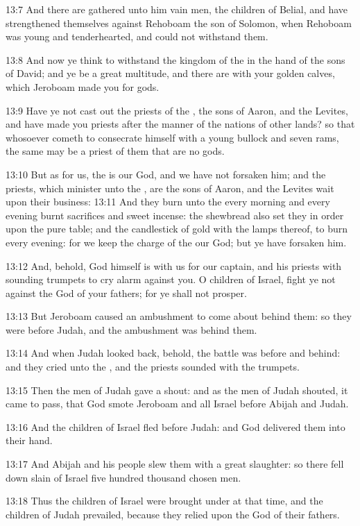 13:7 And there are gathered unto him vain men, the children of Belial,
and have strengthened themselves against Rehoboam the son of Solomon,
when Rehoboam was young and tenderhearted, and could not withstand
them.

13:8 And now ye think to withstand the kingdom of the \LORD in the hand
of the sons of David; and ye be a great multitude, and there are with
your golden calves, which Jeroboam made you for gods.

13:9 Have ye not cast out the priests of the \LORD, the sons of Aaron,
and the Levites, and have made you priests after the manner of the
nations of other lands? so that whosoever cometh to consecrate himself
with a young bullock and seven rams, the same may be a priest of them
that are no gods.

13:10 But as for us, the \LORD is our God, and we have not forsaken
him; and the priests, which minister unto the \LORD, are the sons of
Aaron, and the Levites wait upon their business: 13:11 And they burn
unto the \LORD every morning and every evening burnt sacrifices and
sweet incense: the shewbread also set they in order upon the pure
table; and the candlestick of gold with the lamps thereof, to burn
every evening: for we keep the charge of the \LORD our God; but ye have
forsaken him.

13:12 And, behold, God himself is with us for our captain, and his
priests with sounding trumpets to cry alarm against you. O children of
Israel, fight ye not against the \LORD God of your fathers; for ye
shall not prosper.

13:13 But Jeroboam caused an ambushment to come about behind them: so
they were before Judah, and the ambushment was behind them.

13:14 And when Judah looked back, behold, the battle was before and
behind: and they cried unto the \LORD, and the priests sounded with the
trumpets.

13:15 Then the men of Judah gave a shout: and as the men of Judah
shouted, it came to pass, that God smote Jeroboam and all Israel
before Abijah and Judah.

13:16 And the children of Israel fled before Judah: and God delivered
them into their hand.

13:17 And Abijah and his people slew them with a great slaughter: so
there fell down slain of Israel five hundred thousand chosen men.

13:18 Thus the children of Israel were brought under at that time, and
the children of Judah prevailed, because they relied upon the \LORD God
of their fathers.

